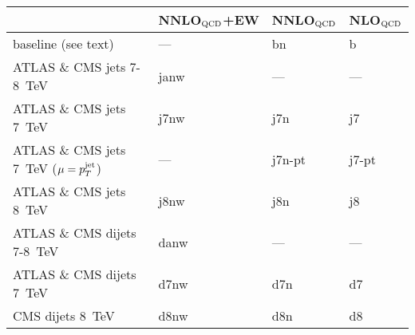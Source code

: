 \begin{tabularx}{\textwidth}{Xlll}
    \toprule
    & NNLO$_{\rm QCD}$+EW
    & NNLO$_{\rm QCD}$
    & NLO$_{\rm QCD}$\\
    \midrule
    baseline (see text)                           &  ---      &  bn     & b    \\
    \midrule
    ATLAS \& CMS jets   7-8~TeV                   & janw      & ---    & ---   \\
    ATLAS \& CMS jets   7~TeV                     & j7nw      & j7n    & j7    \\
    ATLAS \& CMS jets   7~TeV ($\mu=p_T^{\rm jet}$) &  ---      & j7n-pt & j7-pt \\
    ATLAS \& CMS jets   8~TeV                     & j8nw      & j8n    & j8    \\
    \midrule
    ATLAS \& CMS dijets 7-8~TeV                   & danw      & ---    & ---   \\
    ATLAS \& CMS dijets 7~TeV                     & d7nw      & d7n    & d7    \\
    CMS          dijets 8~TeV                     & d8nw      & d8n    & d8    \\
    \bottomrule
    \end{tabularx}
